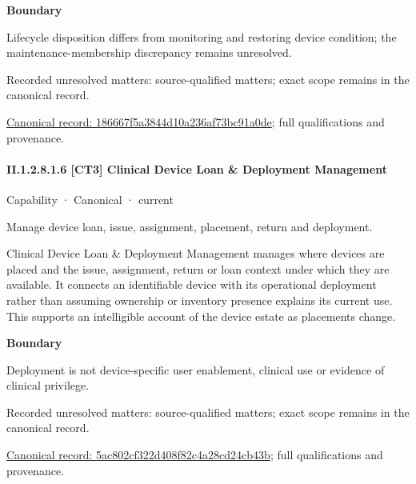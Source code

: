 \textbf{Boundary}



Lifecycle disposition differs from monitoring and restoring device condition; the maintenance-membership discrepancy remains unresolved.


{\small Recorded unresolved matters: source-qualified matters; exact scope remains in the canonical record.}\par
{\footnotesize \href{../../../../../../../continuum/strategy/capability/186667f5a3844d10a236af73bc91a0de.md}{Canonical record: 186667f5a3844d10a236af73bc91a0de}; full qualifications and provenance.}\par
\paragraph*{II.1.2.8.1.6 [CT3] Clinical Device Loan \& Deployment Management}
\label{navigation:II.1.2.8.1.6}

\label{element:5ac802cf322d408f82c4a28cd24cb43b}
{\small Capability · Canonical · current}\par

Manage device loan, issue, assignment, placement, return and deployment.



Clinical Device Loan \& Deployment Management manages where devices are placed and the issue, assignment, return or loan context under which they are available. It connects an identifiable device with its operational deployment rather than assuming ownership or inventory presence explains its current use. This supports an intelligible account of the device estate as placements change.



\textbf{Boundary}



Deployment is not device-specific user enablement, clinical use or evidence of clinical privilege.


{\small Recorded unresolved matters: source-qualified matters; exact scope remains in the canonical record.}\par
{\footnotesize \href{../../../../../../../continuum/strategy/capability/5ac802cf322d408f82c4a28cd24cb43b.md}{Canonical record: 5ac802cf322d408f82c4a28cd24cb43b}; full qualifications and provenance.}\par
